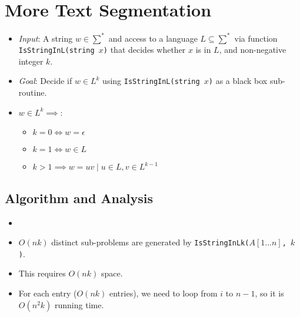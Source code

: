 
\section{More Text Segmentation}
\begin{itemize}
    \item \textit{Input}: A string $w \in \sum^{\ast}$ and access to a language $L \subseteq \sum^{\ast}$ via function \texttt{IsStringInL(string $x$)} that decides whether $x$ is in $L$, and non-negative integer $k$.
    \item \textit{Goal}: Decide if $w \in L^k$ using \texttt{IsStringInL(string $x$)} as a black box sub-routine.
    \item $w \in L^k \implies$:
    \begin{itemize}
        \item $k = 0 \iff w = \epsilon$
        \item $k = 1 \iff w \in L$
        \item $k > 1 \implies w = uv \mid  u \in L, v \in L^{k - 1}$
    \end{itemize}
\end{itemize}

\subsection{Algorithm and Analysis}
\begin{itemize}
    \item[] 
    \item $O(nk)$ distinct sub-problems are generated by \texttt{IsStringInLk($A[1...n]$, $k$)}.
    \item This requires $O(nk)$ space.
    \item For each entry ($O(nk)$ entries), we need to loop from $i$ to $n - 1$, so it is $O(n^2k)$ running time.
\end{itemize}

